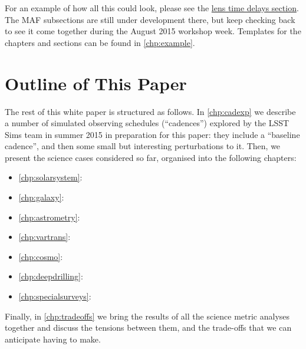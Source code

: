 For an example of how all this could look, please see the
\hyperref[sec:lenstimedelays]{lens
time delays section}. The MAF subsections are still under development
there, but keep checking back to see it come together during the
August 2015 workshop week. Templates for the chapters and sections can
be found in \autoref{chp:example}.

\navigationbar


\section{Outline of This Paper}
\def\secname{intro:outline}\label{sec:\secname}

The rest of this white paper is structured as follows. In
\autoref{chp:cadexp} we describe a number of \OpSim simulated observing
schedules (``cadences'') explored by the LSST Sims team in summer 2015
in preparation for this paper: they include a ``baseline cadence'', and
then some small but interesting perturbations to it. Then, we present
the science cases considered so far, organised into the following
chapters:

\begin{itemize}
    \item \autoref{chp:solarsystem}: 
    \item \autoref{chp:galaxy}: 
    \item \autoref{chp:astrometry}: 
    \item \autoref{chp:vartrans}: 
    \item \autoref{chp:cosmo}: 
    \item \autoref{chp:deepdrilling}: 
    \item \autoref{chp:specialsurveys}: 
\end{itemize}

Finally, in \autoref{chp:tradeoffs} we bring the results of all the
science metric analyses  together and discuss the tensions between
them, and the trade-offs that we can anticipate having to make.

\navigationbar

